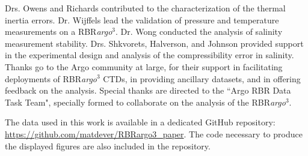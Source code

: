 \documentclass{ametsocV6.1}
\begin{document}
\clearpage
\acknowledgments

Drs. Owens and Richards contributed to the characterization of the thermal inertia errors. Dr. Wijffels lead the validation of pressure and temperature measurements on a RBR\textit{argo}$^3$. Dr. Wong conducted the analysis of salinity measurement stability. Drs. Shkvorets, Halverson, and Johnson provided support in the experimental design and analysis of the compressibility error in salinity. Thanks go to the Argo community at large, for their support in facilitating deployments of RBR\textit{argo}$^3$ CTDs,  in providing ancillary datasets, and in offering feedback on the analysis. Special thanks are directed to the ``Argo RBR Data Task Team", specially formed to collaborate on the analysis of the RBR\textit{argo}$^3$. 

% 
%
\datastatement

The data used in this work is available in a dedicated GitHub repository: \url{https://github.com/matdever/RBRargo3_paper}. The code necessary to produce the displayed figures are also included in the repository.

\end{document}
